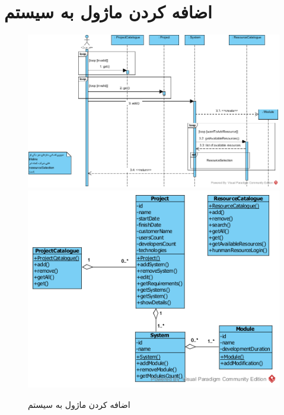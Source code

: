 \section{اضافه کردن ماژول به سیستم}
\begin{figure}[H]
	\centering
	\includegraphics[scale=0.65]{img/sequence-analysis/AddModuleToSystem}
	\includegraphics[scale=0.65]{img/sequence-analysis/AddModuleToSystemC}	
	\caption{اضافه کردن ماژول به سیستم}
\end{figure}

